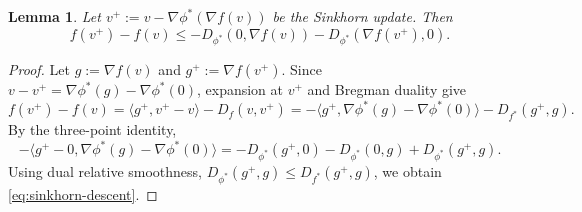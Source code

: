 \documentclass{article}
\theoremstyle{plain}
\newtheorem{lemma}{Lemma}
\theoremstyle{remark}
\newtheorem*{remark}{Remark}
\begin{document}




\begin{lemma}\label{lem:sinkhorn-descent}
Let
$
v^+:=v-\nabla\phi^*(\nabla f(v))
$
be the Sinkhorn update. Then
\begin{equation}\label{eq:sinkhorn-descent}
f(v^+)-f(v)
\le
-D_{\phi^*}(0,\nabla f(v))
-D_{\phi^*}(\nabla f(v^+),0).
\end{equation}
\end{lemma}
\begin{proof}
Let $g:=\nabla f(v)$ and $g^+:=\nabla f(v^+)$. Since $v-v^+=\nabla\phi^*(g)-\nabla\phi^*(0)$, expansion at $v^+$ and Bregman duality give
$$
f(v^+)-f(v)
=
\langle g^+,v^+-v\rangle-D_f(v,v^+)
=
-\langle g^+,\nabla\phi^*(g)-\nabla\phi^*(0)\rangle-D_{f^*}(g^+,g).
$$
By the three-point identity,
$$
-\langle g^+-0,\nabla\phi^*(g)-\nabla\phi^*(0)\rangle
=
-D_{\phi^*}(g^+,0) - D_{\phi^*}(0,g) + D_{\phi^*}(g^+,g).
$$
Using dual relative smoothness, $D_{\phi^*}(g^+,g)\le D_{f^*}(g^+,g)$, we obtain \eqref{eq:sinkhorn-descent}.
\end{proof}
\end{document}
